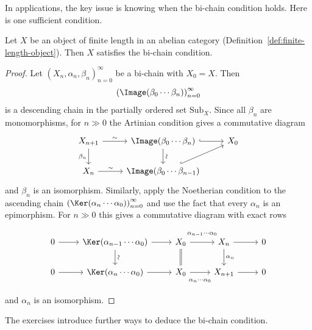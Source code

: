 In applications, the key issue is knowing when the bi-chain condition holds.
Here is one sufficient condition.

\begin{proposition}
	Let $X$ be an object of finite length in an abelian category
	(Definition~\ref{def:finite-length-object}). Then $X$ satisfies the
	bi-chain condition.
\end{proposition}
\begin{proof}
	Let $(X_n,\alpha_n,\beta_n)_{n=0}^\infty$ be a bi-chain with $X_0=X$.
	Then
	\[
		\left(\Image(\beta_0\cdots\beta_n)\right)_{n=0}^\infty
	\]
	is a descending chain in the partially ordered set $\mathrm{Sub}_X$. Since all
	$\beta_n$ are monomorphisms, for $n\gg0$ the Artinian condition gives a
	commutative diagram
	\[\begin{tikzcd}
		X_{n+1} \arrow[d, "\beta_n"'] \arrow[r, "\sim"] & \Image(\beta_0 \cdots \beta_n) \arrow[d, "\sim" sloped] \arrow[hookrightarrow, r] & X_0 \\
		X_n \arrow[r, "\sim"] & \Image(\beta_0 \cdots \beta_{n-1}) \arrow[hookrightarrow, ru] &
	\end{tikzcd}\]
	and $\beta_n$ is an isomorphism. Similarly, apply the Noetherian condition
	to the ascending chain
	$\left(\Ker(\alpha_n\cdots\alpha_0)\right)_{n=0}^\infty$ and use the fact
	that every $\alpha_n$ is an epimorphism. For $n\gg0$ this gives a
	commutative diagram with exact rows
	\[\begin{tikzcd}
		0 \arrow[r] & \Ker(\alpha_{n-1} \cdots \alpha_0) \arrow[d, "\sim" sloped] \arrow[r] & X_0 \arrow[r, "{\alpha_{n-1} \cdots \alpha_0}" inner sep=0.7em] \arrow[equal, d] & X_n \arrow[d, "{\alpha_n}"] \arrow[r] & 0 \\
		0 \arrow[r] & \Ker(\alpha_n \cdots \alpha_0) \arrow[r] & X_0 \arrow[r, "{\alpha_n \cdots \alpha_0}"' inner sep=0.7em] & X_{n+1} \arrow[r] & 0
	\end{tikzcd}\]
	and $\alpha_n$ is an isomorphism.
\end{proof}

The exercises introduce further ways to deduce the bi-chain condition.
